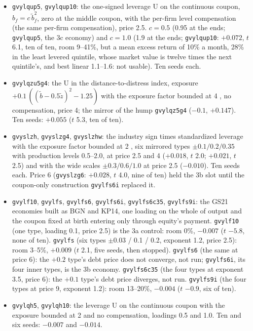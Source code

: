 \documentclass[11pt]{article}
\begin{document}
\begin{itemize}
\item \texttt{gvylqup5}, \texttt{gvylqup10}: the one-signed leverage U on the continuous coupon, $b_f = c\,\tilde b_f^2$, zero at the middle coupon, with the per-firm level compensation (the same per-firm compensation), price 2.5. $c = 0.5$ (0.95 at the ends; \texttt{gvylqup5}, the 3c economy) and $c = 1.0$ (1.9 at the ends; \texttt{gvylqup10}: $+0.072$, $t$ 6.1, ten of ten, room 9--41\%, but a mean excess return of 10\% a month, 28\% in the least levered quintile, whose market value is twelve times the next quintile's, and best linear 1.1--1.6: not usable). Ten seeds each.
\item \texttt{gvylqzu5g4}: the U in the distance-to-distress index, exposure $+0.1\,((\tilde b - 0.5\tilde z)^2 - 1.25)$ with the exposure factor bounded at 4 , no compensation, price 4; the mirror of the hump \texttt{gvylqz5g4} ($-0.1$, $+0.147$). Ten seeds: $+0.055$ ($t$ 5.3, ten of ten).
\item \texttt{gvyslzh}, \texttt{gvyslzg4}, \texttt{gvyslzhw}: the industry sign times standardized leverage with the exposure factor bounded at 2 , six mirrored types $\pm0.1/0.2/0.35$ with production levels 0.5--2.0, at price 2.5 and 4 ($+0.018$, $t$ 2.0; $+0.021$, $t$ 2.5) and with the wide scales $\pm0.3/0.6/1.0$ at price 2.5 ($-0.010$). Ten seeds each. Price 6 (\texttt{gvyslzg6}: $+0.028$, $t$ 4.0, nine of ten) held the 3b slot until the coupon-only construction \texttt{gvylfs6i} replaced it.
\item \texttt{gvylf10}, \texttt{gvylfs}, \texttt{gvylfs6}, \texttt{gvylfs6i}, \texttt{gvylfs6c35}, \texttt{gvylfs9i}: the GS21 economies built as BGN and KP14, one loading on the whole of output and the coupon fixed at birth entering only through equity's payment. \texttt{gvylf10} (one type, loading 0.1, price 2.5) is the 3a control: room 0\%, $-0.007$ ($t$ $-5.8$, none of ten). \texttt{gvylfs} (six types $\pm 0.03$ / 0.1 / 0.2, exponent 1.2, price 2.5): room 3--5\%, $+0.009$ ($t$ 2.1, five seeds, then stopped). \texttt{gvylfs6} (the same at price 6): the $+0.2$ type's debt price does not converge, not run; \texttt{gvylfs6i}, its four inner types, is the 3b economy. \texttt{gvylfs6c35} (the four types at exponent 3.5, price 6): the $+0.1$ type's debt price diverges, not run. \texttt{gvylfs9i} (the four types at price 9, exponent 1.2): room 13--20\%, $-0.004$ ($t$ $-0.9$, six of ten).
\item \texttt{gvylqh5}, \texttt{gvylqh10}: the leverage U on the continuous coupon with the exposure bounded at 2 and no compensation, loadings 0.5 and 1.0. Ten and six seeds: $-0.007$ and $-0.014$.

\end{itemize}
\end{document}
